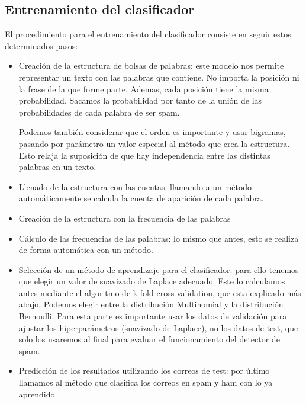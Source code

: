 \documentclass[12pt]{article}
\begin{document}
\subsection{Entrenamiento del clasificador}
El procedimiento para el entrenamiento del clasificador consiste en seguir
estos determinados pasos:
\begin{itemize}
	\item Creaci\'on de la estructura de bolsas de palabras: este modelo nos
	permite representar un texto con las palabras que contiene. No importa
	la posici\'on ni la frase de la que forme parte. Ademas, cada posici\'on
	tiene la misma probabilidad. Sacamos la probabilidad por tanto de la
	uni\'on de las probabilidades de cada palabra de ser spam.

	Podemos tambi\'en considerar que el orden es importante y usar bigramas,
	pasando por par\'ametro un valor especial al m\'etodo que crea la
	estructura. Esto relaja la suposici\'on de que hay independencia entre
	las distintas palabras en un texto.

	\item Llenado de la estructura con las cuentas: llamando a un m\'etodo
	autom\'aticamente se calcula la cuenta de aparici\'on de cada palabra.

	\item Creaci\'on de la estructura con la frecuencia de las palabras

	\item C\'alculo de las frecuencias de las palabras: lo mismo que antes,
	esto se realiza de forma autom\'atica con un m\'etodo.

	\item Selecci\'on de un m\'etodo de aprendizaje para el clasificador:
	para ello tenemos que elegir un valor de suavizado de Laplace adecuado.
	Este lo calculamos antes mediante el algoritmo de k-fold cross
	validation, que esta explicado m\'as abajo. Podemos elegir entre la
	distribuci\'on Multinomial y la distribuci\'on Bernoulli. Para esta
	parte es importante usar los datos de validaci\'on para ajustar los
	hiperpar\'ametros (suavizado de Laplace), no los datos de test, que solo
	los usaremos al final para evaluar el funcionamiento del detector de
	spam.

	\item Predicci\'on de los resultados utilizando los correos de test: por
	\'ultimo llamamos al m\'etodo que clasifica los correos en spam y ham
	con lo ya aprendido.
\end{itemize}
\end{document}
